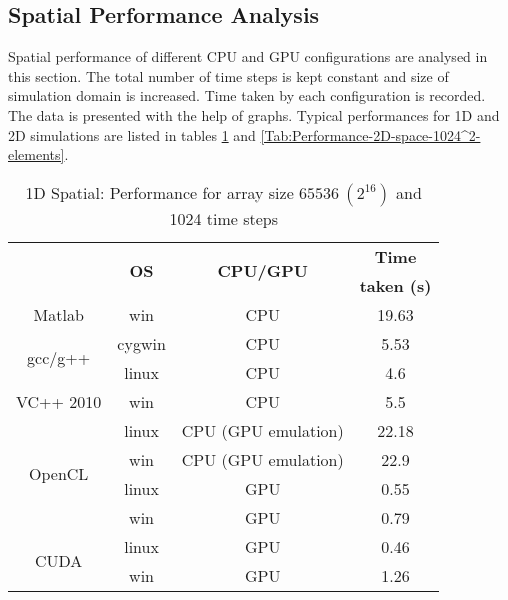 \subsection{Spatial Performance Analysis}
Spatial performance of different CPU and GPU configurations are analysed in this section. The total number of time steps is kept constant and size of simulation domain is increased. Time taken by each configuration is recorded. The data is presented with the help of graphs. Typical performances for 1D and 2D simulations are listed in tables \ref{Tab:Performance-1D-space-65536-elements} and \ref{Tab:Performance-2D-space-1024^2-elements}.
\begin{table}[H]
\begin{center}
\vspace{0.3cm}
	\begin{tabular}{cccc}
	\hline \hline
		\rule{0pt}{2.6ex} & \multirow{2}{*}{\textbf{OS}} & \multirow{2}{*}{\textbf{CPU/GPU}}  & \textbf{Time}\\
		& &  & \textbf{taken (s)}\\
		\hline
		Matlab \rule{0pt}{2.6ex} & win & CPU &19.63\\
		\hline
		\multirow{2}{*}{gcc/g++} \rule{0pt}{2.6ex} & cygwin & CPU &5.53\\
		& linux & CPU &4.6\\
		\hline
		VC++ 2010 \rule{0pt}{2.6ex} & win & CPU &5.5\\
		\hline
		\multirow{4}{*}{OpenCL} \rule{0pt}{2.6ex} & linux & CPU (GPU emulation) &22.18\\
		& win & CPU (GPU emulation) &22.9\\
		& linux & GPU &0.55\\
		& win & GPU &0.79\\
		\hline
		\multirow{2}{*}{CUDA} \rule{0pt}{2.6ex} & linux & GPU &0.46\\
		& win & GPU &1.26\\
	\hline \hline
	\end{tabular}
\end{center}
\caption{1D Spatial: Performance for array size $65536~(2^{16})$ and 1024 time steps}
\label{Tab:Performance-1D-space-65536-elements}
\end{table}
